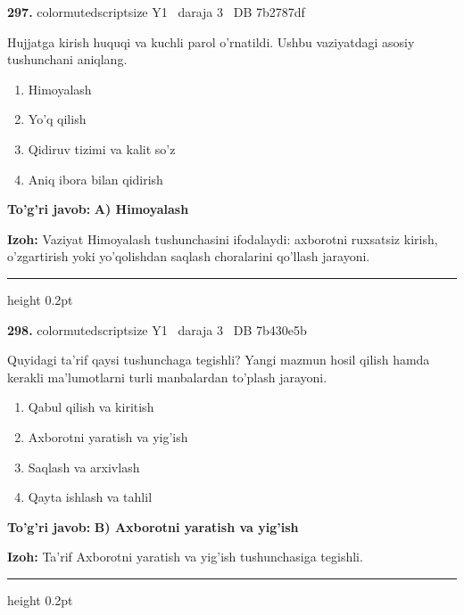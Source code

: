 \documentclass[10pt,a4paper,oneside]{article}
\begin{document}
\noindent\textbf{\color{ink}297.}  {color{muted}scriptsize Y1 \textbullet\ daraja 3 \textbullet\ DB 7b2787df}
\par
Hujjatga kirish huquqi va kuchli parol o'rnatildi. Ushbu vaziyatdagi asosiy tushunchani aniqlang.
\begin{enumerate}[label=\Alph*),leftmargin=9mm]
\item Himoyalash
\item Yo'q qilish
\item Qidiruv tizimi va kalit so'z
\item Aniq ibora bilan qidirish
\end{enumerate}
\begin{tcolorbox}[enhanced,breakable,colback=teal!4,colframe=teal!50!black,boxrule=0.5pt,arc=1.1mm,left=3mm,right=3mm,top=1.7mm,bottom=1.7mm,before skip=2mm,after skip=2mm]
\textbf{\color{teal}To'g'ri javob:} \textbf{A) Himoyalash}
\par\smallskip
\textbf{Izoh:} Vaziyat Himoyalash tushunchasini ifodalaydi: axborotni ruxsatsiz kirish, o'zgartirish yoki yo'qolishdan saqlash choralarini qo'llash jarayoni.
\end{tcolorbox}
\vspace{2mm}\hrule height 0.2pt \vspace{3mm}

\noindent\textbf{\color{ink}298.}  {color{muted}scriptsize Y1 \textbullet\ daraja 3 \textbullet\ DB 7b430e5b}
\par
Quyidagi ta'rif qaysi tushunchaga tegishli? Yangi mazmun hosil qilish hamda kerakli ma'lumotlarni turli manbalardan to'plash jarayoni.
\begin{enumerate}[label=\Alph*),leftmargin=9mm]
\item Qabul qilish va kiritish
\item Axborotni yaratish va yig'ish
\item Saqlash va arxivlash
\item Qayta ishlash va tahlil
\end{enumerate}
\begin{tcolorbox}[enhanced,breakable,colback=teal!4,colframe=teal!50!black,boxrule=0.5pt,arc=1.1mm,left=3mm,right=3mm,top=1.7mm,bottom=1.7mm,before skip=2mm,after skip=2mm]
\textbf{\color{teal}To'g'ri javob:} \textbf{B) Axborotni yaratish va yig'ish}
\par\smallskip
\textbf{Izoh:} Ta'rif Axborotni yaratish va yig'ish tushunchasiga tegishli.
\end{tcolorbox}
\vspace{2mm}\hrule height 0.2pt \vspace{3mm}
\end{document}
